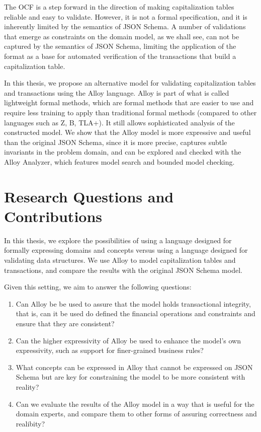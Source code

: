 The OCF is a step forward in the direction of making capitalization tables reliable and easy to validate. However, it is not a formal specification, and it is inherently limited by the semantics of JSON Schema. A number of validations that emerge as constraints on the domain model, as we shall see, can not be captured by the semantics of JSON Schema, limiting the application of the format as a base for automated verification of the transactions that build a capitalization table.


In this thesis, we propose an alternative model for validating capitalization tables and transactions using the Alloy\cite{DJSALLA} language. Alloy is part of what is called lightweight formal methods, which are formal methods that are easier to use and require less training to apply than traditional formal methods (compared to other languages such as Z, B, TLA+)\cite{DJLMF}. It still allows sophisticated analysis of the constructed model. We show that the Alloy model is more expressive and useful than the original JSON Schema, since it is more precise, captures subtle invariants in the problem domain, and can be explored and checked with the Alloy Analyzer, which features model search and bounded model checking. 

\section{Research Questions and Contributions}

In this thesis, we explore the possibilities of using a language designed for formally expressing domains and concepts versus using a language designed for validating data structures. We use Alloy to model capitalization tables and transactions, and compare the results with the original JSON Schema model.

Given this setting, we aim to answer the following questions:

\begin{enumerate}
	\item Can Alloy be be used to assure that the model holds transactional integrity, that is, can it be used do defined the financial operations and constraints and ensure that they are consistent?
	\item Can the higher expressivity of Alloy be used to enhance the model's own expressivity, such as support for finer-grained business rules?
	\item What concepts can be expressed in Alloy that cannot be expressed on JSON Schema but are key for constraining the model to be more consistent with reality?
	\item Can we evaluate the results of the Alloy model in a way that is useful for the domain experts, and compare them to other forms of assuring correctness and realibity?
\end{enumerate}


